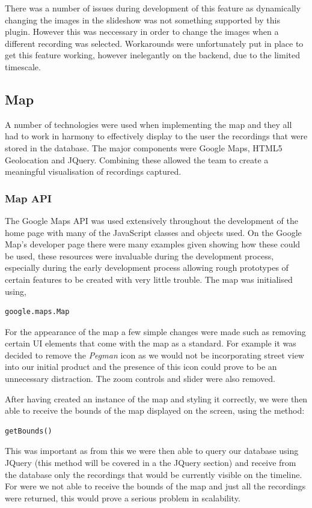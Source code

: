\documentclass{l3proj}
\begin{document}
There was a number of issues during development of this feature as dynamically changing the images in the slideshow was not something supported by this plugin. However this was neccessary in order to change the images when a different recording was selected. Workarounds were unfortunately put in place to get this feature working, however inelegantly on the backend, due to the limited timescale.

\subsection{Map}		A number of technologies were used when implementing the map and they all had to work in harmony to effectively display to the user the recordings that were stored in the database. The major components were Google Maps, HTML5 Geolocation and \gls{JQuery}. Combining these allowed the team to create a meaningful visualisation of recordings captured.

\subsubsection{Map API}		The Google Maps \gls{API} was used extensively throughout the development of the home page with many of the \gls{JavaScript} classes and objects used. On the Google Map's developer page there were many examples given showing how these could be used, these resources were invaluable during the development process, especially during the early development process allowing rough prototypes of certain features to be created with very little trouble. The map was initialised using,
\begin{verbatim}
google.maps.Map
\end{verbatim}
For the appearance of the map a few simple changes were made such as removing certain UI elements that come with the map as a standard. For example it was decided to remove the \textit{Pegman} icon as we would not be incorporating street view into our initial product and the presence of this icon could prove to be an unnecessary distraction. The zoom controls and slider were also removed.

After having created an instance of the map and styling it correctly, we were then able to receive the bounds of the map displayed on the screen, using the method:
\begin{verbatim}
getBounds()
\end{verbatim}
This was important as from this we were then able to query our database using \gls{JQuery} (this method will be covered in a the JQuery section) and receive from the database only the recordings that would be currently visible on the timeline. For were we not able to receive the bounds of the map and just all the recordings were returned, this would prove a serious problem in scalability.
\end{document}
